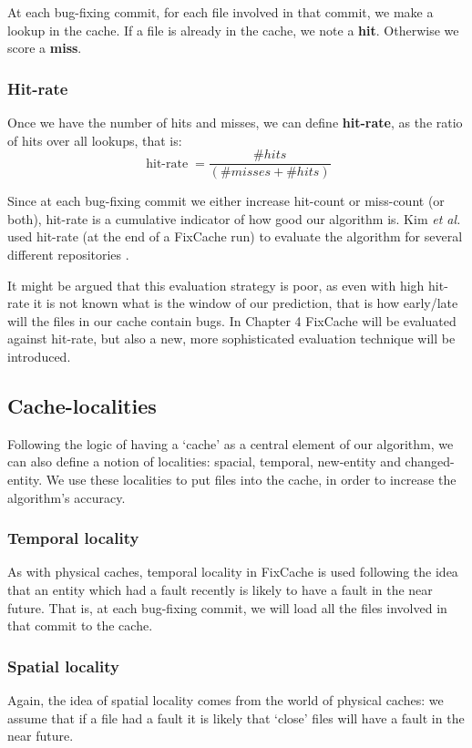 \documentclass[12pt,twoside,notitlepage]{report}
\newcommand{\fxch}{FixCache}
\newcommand{\etal}{\textit{et al.}}
\begin{document}
At each bug-fixing commit, for each file involved in that commit, we make a lookup in the cache. If a file is already in the cache, we note a \textbf{hit}. Otherwise we score a \textbf{miss}.
\subsubsection*{Hit-rate}
Once we have the number of hits and misses, we can define \textbf{hit-rate}, as the ratio of hits over all lookups, that is:
\vspace{0.2in}
\[
	\operatorname{hit-rate} = \frac{\#hits}{(\#misses + \#hits)}
\]

\vspace{0.2in}

Since at each bug-fixing commit we either increase hit-count or miss-count (or both), hit-rate is a cumulative indicator of how good our algorithm is. Kim \etal{} used hit-rate (at the end of a \fxch{} run) to evaluate the algorithm for several different repositories \cite{FixCache}.

It might be argued that this evaluation strategy is poor, as even with high hit-rate it is not known what is the window of our prediction, that is how early/late will the files in our cache contain bugs. In Chapter 4 \fxch{} will be evaluated against hit-rate, but also a new, more sophisticated evaluation technique will be introduced.
\subsection{Cache-localities}
Following the logic of having a `cache' as a central element of our algorithm, we can also define a notion of localities: spacial, temporal, new-entity and changed-entity. We use these localities to put files into the cache, in order to increase the algorithm's accuracy.
\subsubsection{Temporal locality}
As with physical caches, temporal locality in \fxch{} is used following the idea that an entity which had a fault recently is likely to have a fault in the near future. That is, at each bug-fixing commit, we will load all the files involved in that commit to the cache.
\subsubsection{Spatial locality}
Again, the idea of spatial locality comes from the world of physical caches: we assume that if a file had a fault it is likely that `close' files will have a fault in the near future.
\end{document}
